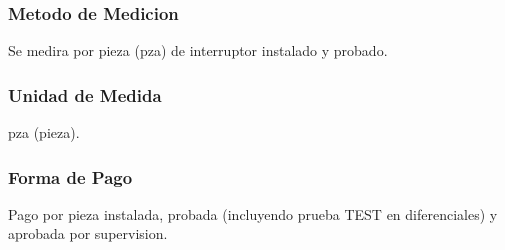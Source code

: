 \subsubsection{Metodo de Medicion}

Se medira por pieza (pza) de interruptor instalado y probado.

\subsubsection{Unidad de Medida}

pza (pieza).

\subsubsection{Forma de Pago}

Pago por pieza instalada, probada (incluyendo prueba TEST en diferenciales) y aprobada por supervision.
